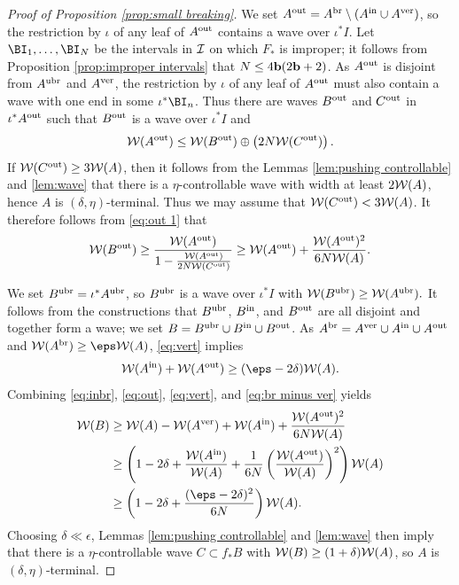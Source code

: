 \documentclass[12pt]{amsart}
\begin{document}
\begin{proof}[Proof of Proposition \ref{prop:small breaking}]
	
	
	We set $A^{\operatorname{out}} = A^{\mathrm{br}}\setminus (A^{\mathrm{in}}\cup A^{\mathrm{ver}})$, so the restriction by $\iota$ of any leaf of $A^{\operatorname{out}}$ contains a wave over $\iota^*I$. 
	Let $\BI_1, \dots, \BI_N$ be the intervals in $\mathcal I$ on which $F_*$ is improper; it follows from Proposition \ref{prop:improper intervals} that $N\leq 4\mathbf b(2\mathbf b+2)$.
	As $A^{\operatorname{out}}$ is disjoint from $A^{\mathrm{ubr}}$ and $A^{\mathrm{ver}}$, the restriction by $\iota$ of any leaf of $A^{\operatorname{out}}$ must also contain a wave with one end in some $\iota^*\BI_n$. Thus there are waves $B^{\operatorname{out}}$ and $C^{\operatorname{out}}$ in $\iota^*A^{\operatorname{out}}$ such that $B^{\operatorname{out}}$ is a wave over $\iota^*I$ and
	\begin{equation}\label{eq:out 1}
		\mathcal W(A^{\operatorname{out}})\leq \mathcal W(B^{\operatorname{out}})\oplus \left(2N\mathcal W(C^{\operatorname{out}})\right).
	\end{equation}
	If $\mathcal W(C^{\operatorname{out}})\geq 3\mathcal W(A)$, 
	then it follows from the Lemmas \ref{lem:pushing controllable} and \ref{lem:wave} that there is a $\eta$-controllable wave with width at least $2\mathcal W(A)$, hence $A$ is $(\delta, \eta)$-terminal. Thus we may assume that $\mathcal W(C^{\operatorname{out}})<  3\mathcal W(A)$. 
	It therefore follows from \eqref{eq:out 1} that 
	\begin{equation}\label{eq:out}
		\mathcal W(B^{\operatorname{out}})\geq  \frac{\mathcal W(A^{\operatorname{out}})}{1- \frac{\mathcal W(A^{\operatorname{out}})}{2N\mathcal W(C^{\operatorname{out}})}}\geq \mathcal W(A^{\operatorname{out}})+ \frac{\mathcal W(A^{\operatorname{out}})^2}{6N\mathcal W(A)}.
	\end{equation}
	
	
	We set   $B^{\mathrm{ubr}}= \iota^*A^{\mathrm{ubr}}$, so $B^{\mathrm{ubr}}$ is a wave over $\iota^*I$ with $\mathcal W(B^{\mathrm{ubr}})\geq \mathcal W(A^{\mathrm{ubr}}).$
	It follows from the constructions that $B^{\mathrm{ubr}}$, $B^{\mathrm{in}}$, and $B^{\operatorname{out}}$ are all disjoint and together form a wave; we set $B = B^{\mathrm{ubr}}\cup B^{\mathrm{in}}\cup B^{\operatorname{out}}$.
	As $A^{\mathrm{br}} = A^{\mathrm{ver}}\cup A^{\mathrm{in}}\cup A^{\operatorname{out}}$ and $\WW(A^\br)\geq \eps\WW(A)$,  \eqref{eq:vert} implies 
	\begin{equation}\label{eq:br minus ver}
		\WW(A^\inbr)+ \WW(A^{\out})\geq (\eps-2\delta)\WW(A).
	\end{equation}
	Combining 
	\eqref{eq:inbr}, \eqref{eq:out}, \eqref{eq:vert}, and \eqref{eq:br minus ver} yields
	\begin{align*}
		\WW(B)&\geq \WW(A)- \WW(A^\ver)+ \WW(A^\inbr)+ \frac{\WW(A^{\out})^2}{6N\WW(A)}\\
		& \geq \left(1- 2\delta+\frac{\WW(A^\inbr)}{\WW(A)}+ \frac{1}{6N}\left(\frac{\WW(A^{\out})}{\WW(A)}\right)^2\right)\WW(A)\\
		&\geq \left(1- 2\delta+ \frac{(\eps-2\delta)^2}{6N}\right)\WW(A).
	\end{align*}
	Choosing $\delta\ll\epsilon$, 
	Lemmas \ref{lem:pushing controllable} and \ref{lem:wave} then imply  
	that there is a $\eta$-controllable wave $C\subset f_*B$ with $\mathcal W(B)\geq (1+\delta)\mathcal W(A)$, so $A$ is $(\delta, \eta)$-terminal.

\end{proof}
\end{document}
